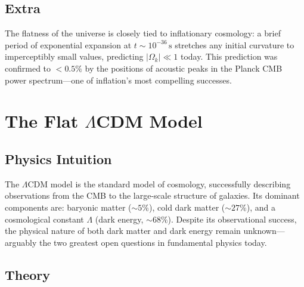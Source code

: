 \subsection{Extra}

\begin{extra}
The flatness of the universe is closely tied to inflationary cosmology:
a brief period of exponential expansion at $t \sim 10^{-36}\,\mathrm{s}$
stretches any initial curvature to imperceptibly small values, predicting
$|\Omega_k| \ll 1$ today.
This prediction was confirmed to $<0.5\%$ by the positions of acoustic peaks
in the Planck CMB power spectrum—one of inflation's most compelling successes.
\end{extra}

\section{The Flat $\Lambda$CDM Model}

\subsection{Physics Intuition}

\begin{intuition}
The $\Lambda$CDM model is the standard model of cosmology, successfully describing
observations from the CMB to the large-scale structure of galaxies.
Its dominant components are: baryonic matter ($\sim5\%$), cold dark matter
($\sim27\%$), and a cosmological constant $\Lambda$ (dark energy, $\sim68\%$).
Despite its observational success, the physical nature of both dark matter and
dark energy remain unknown—arguably the two greatest open questions in
fundamental physics today.
\end{intuition}

\subsection{Theory}

